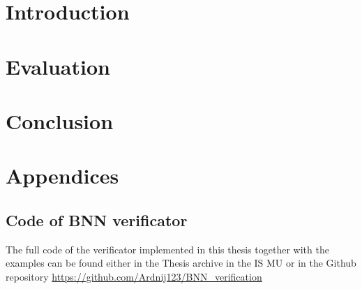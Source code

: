 \documentclass[
    digital,
    color,
    oneside,
    sansbold,
    lot,
    nolof
]{fithesis4}
\begin{document}
\listoftheorems[
    title={List of Definitions},
    ignoreall,
    show={definition},
    numwidth=3em,
]


\chapter{Introduction}





\chapter{Evaluation}

\chapter{Conclusion}

\chapter*{Appendices}

\section*{Code of BNN verificator}
The full code of the verificator implemented in this thesis together with
the examples can be found either in the Thesis archive in the IS MU
or in the Github repository \href{https://github.com/Ardnij123/BNN_verification}{https://github.com/Ardnij123/BNN\_verification}
\end{document}

